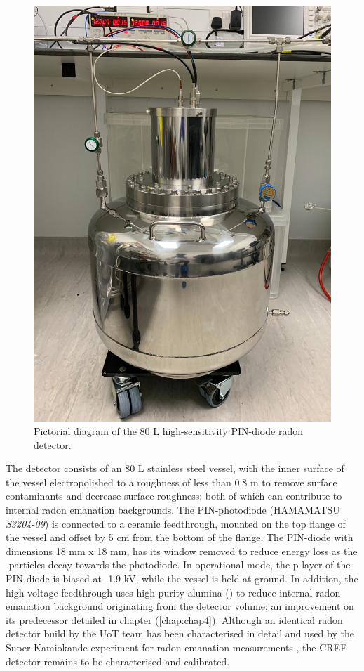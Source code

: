 \begin{figure}[h!]
    \centering
    \includegraphics[scale=0.1]{Chapter_7/Figures/detector_image.pdf}
    \caption[Pictorial diagram of the 80 L high-sensitivity PIN-diode radon detector.]%
    {Pictorial diagram of the 80 L high-sensitivity PIN-diode radon detector.}
    \label{fig:cref_detector}
\end{figure}
%

The detector consists of an 80 L stainless steel vessel, with the inner surface of the vessel electropolished to a roughness of less than 0.8 \micro{}m to remove surface contaminants and decrease surface roughness; both of which can contribute to internal radon emanation backgrounds. The PIN-photodiode (HAMAMATSU \textit{S3204-09}) is connected to a ceramic feedthrough, mounted on the top flange of the vessel and offset by 5 cm from the bottom of the flange. The PIN-diode with dimensions 18 mm x 18 mm, has its window removed to reduce energy loss as the \alpha-particles decay towards the photodiode. In operational mode, the p-layer of the PIN-diode is biased at -1.9 kV, while the vessel is held at ground. In addition, the high-voltage feedthrough uses high-purity alumina (\alumina{}) to reduce internal radon emanation background originating from the detector volume; an improvement on its predecessor detailed in chapter (\ref{chap:chap4}). Although an identical radon detector build by the UoT team has been characterised in detail and used by the Super-Kamiokande experiment for radon emanation measurements \cite{Hosokawa:2015koa, Nakano:2017rsy}, the CREF detector remains to be characterised and calibrated.


